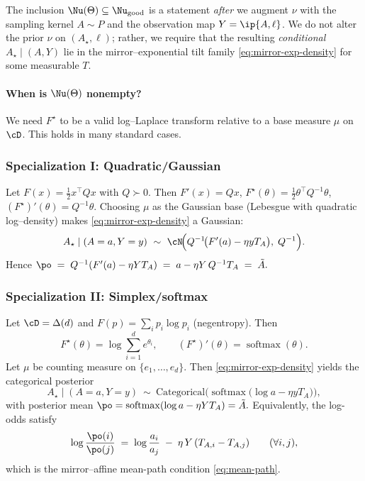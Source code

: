 \begin{remark}
    The inclusion $\Nu(\Theta)\subseteq \Nu_{\text{good}}$ is a statement \emph{after} we augment $\nu$ with the sampling kernel $A\sim P$ and the observation map $Y=\ip{A,\ell}$. We do not alter the prior $\nu$ on $(A_\star,\ell)$; rather, we require that the resulting \emph{conditional} $A_\star\mid(A,Y)$ lie in the mirror–exponential tilt family \eqref{eq:mirror-exp-density} for some measurable $T$.
\end{remark}

\paragraph{When is \texorpdfstring{$\Nu(\Theta)$}{Nu(Theta)} nonempty?}
We need $F^\star$ to be a valid log–Laplace transform relative to a base measure $\mu$ on $\cD$. This holds in many standard cases.

\subsubsection*{Specialization I: Quadratic/Gaussian}
Let $F(x)=\tfrac12 x^\top Q x$ with $Q\succ0$. Then $F'(x)=Qx$, $F^\star(\theta)=\tfrac12\theta^\top Q^{-1}\theta$, $(F^\star)'(\theta)=Q^{-1}\theta$. Choosing $\mu$ as the Gaussian base (Lebesgue with quadratic log–density) makes \eqref{eq:mirror-exp-density} a Gaussian:
\[
    A_\star \mid (A=a,Y=y)\ \sim\ \cN\!\Big(Q^{-1}\!\big(F'(a)-\eta y T_A\big),\; Q^{-1}\Big).
\]
Hence
\(
\po \;=\; Q^{-1}(F'(a)-\eta Y T_A)\;=\; a - \eta Y\,Q^{-1}T_A\;=\;\tilde A.
\)

\subsubsection*{Specialization II: Simplex/softmax}
Let $\cD=\Delta(d)$ and $F(p)=\sum_i p_i\log p_i$ (negentropy). Then
\[
    F^\star(\theta)=\log\sum_{i=1}^d e^{\theta_i},\qquad (F^\star)'(\theta)=\operatorname{softmax}(\theta).
\]
Let $\mu$ be counting measure on $\{e_1,\dots,e_d\}$. Then \eqref{eq:mirror-exp-density} yields the categorical posterior
\[
    A_\star\mid(A=a,Y=y)\ \sim\ \text{Categorical}\!\Big(\operatorname{softmax}\big(\log a - \eta y T_A\big)\Big),
\]
with posterior mean
\(
\po=\operatorname{softmax}(\log a - \eta Y T_A)=\tilde A.
\)
Equivalently, the log-odds satisfy
\[
    \log\frac{\po(i)}{\po(j)} \;=\; \log\frac{a_i}{a_j}\;-\;\eta\,Y\,(T_{A,i}-T_{A,j})\qquad(\forall i,j),
\]
which is the mirror–affine mean-path condition \eqref{eq:mean-path}.

